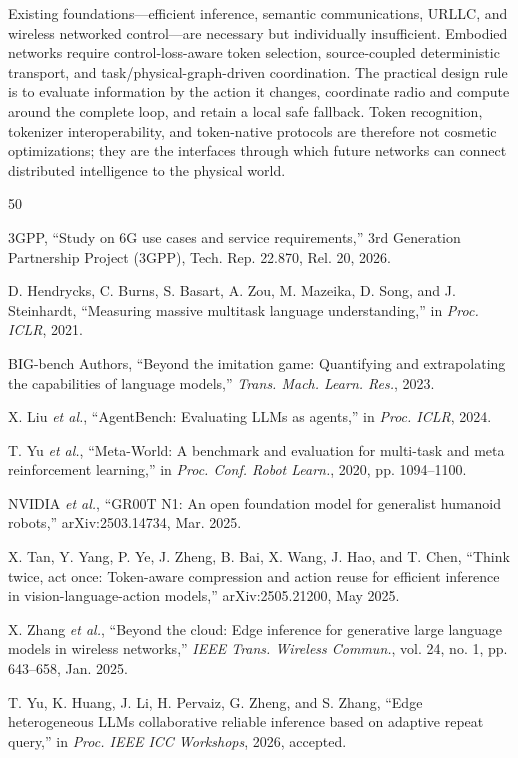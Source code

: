 \documentclass[letterpaper,journal]{IEEEtran}
\newcommand{\etal}{\emph{et al.}}
\begin{document}
Existing foundations---efficient inference, semantic communications, URLLC,
and wireless networked control---are necessary but individually insufficient.
Embodied networks require control-loss-aware token selection,
source-coupled deterministic transport, and task/physical-graph-driven
coordination. The practical design rule is to evaluate information by the
action it changes, coordinate radio and compute around the complete loop, and
retain a local safe fallback. Token recognition, tokenizer interoperability,
and token-native protocols are therefore not cosmetic optimizations; they are
the interfaces through which future networks can connect distributed
intelligence to the physical world.

\begin{thebibliography}{50}

3GPP, ``Study on 6G use cases and service requirements,'' 3rd Generation
Partnership Project (3GPP), Tech. Rep. 22.870, Rel. 20, 2026.

D. Hendrycks, C. Burns, S. Basart, A. Zou, M. Mazeika, D. Song, and
J. Steinhardt, ``Measuring massive multitask language understanding,'' in
\emph{Proc. ICLR}, 2021.

BIG-bench Authors, ``Beyond the imitation game: Quantifying and extrapolating
the capabilities of language models,'' \emph{Trans. Mach. Learn. Res.}, 2023.

X. Liu \etal, ``AgentBench: Evaluating LLMs as agents,'' in \emph{Proc. ICLR},
2024.

T. Yu \etal, ``Meta-World: A benchmark and evaluation for multi-task and
meta reinforcement learning,'' in \emph{Proc. Conf. Robot Learn.}, 2020,
pp. 1094--1100.

NVIDIA \etal, ``GR00T N1: An open foundation model for generalist humanoid
robots,'' arXiv:2503.14734, Mar. 2025.

X. Tan, Y. Yang, P. Ye, J. Zheng, B. Bai, X. Wang, J. Hao, and T. Chen,
``Think twice, act once: Token-aware compression and action reuse for
efficient inference in vision-language-action models,'' arXiv:2505.21200,
May 2025.

X. Zhang \etal, ``Beyond the cloud: Edge inference for generative large
language models in wireless networks,'' \emph{IEEE Trans. Wireless Commun.},
vol. 24, no. 1, pp. 643--658, Jan. 2025.

T. Yu, K. Huang, J. Li, H. Pervaiz, G. Zheng, and S. Zhang, ``Edge
heterogeneous LLMs collaborative reliable inference based on adaptive repeat
query,'' in \emph{Proc. IEEE ICC Workshops}, 2026, accepted.


\end{thebibliography}
\end{document}
